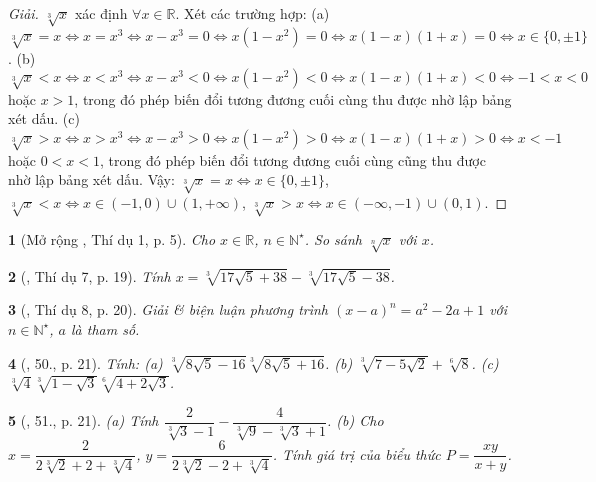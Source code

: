 \documentclass{article}
\newtheorem{baitoan}{}
\begin{document}
\begin{proof}[Giải]
	$\sqrt[3]{x}$ xác định $\forall x\in\mathbb{R}$. Xét các trường hợp: (a) $\sqrt[3]{x} = x\Leftrightarrow x = x^3\Leftrightarrow x - x^3 = 0\Leftrightarrow x(1 - x^2) = 0\Leftrightarrow x(1 - x)(1 + x) = 0\Leftrightarrow x\in\{0,\pm1\}$. (b) $\sqrt[3]{x} < x\Leftrightarrow x < x^3\Leftrightarrow x - x^3 < 0\Leftrightarrow x(1 - x^2) < 0\Leftrightarrow x(1 - x)(1 + x) < 0\Leftrightarrow -1 < x < 0$ hoặc $x > 1$, trong đó phép biến đổi tương đương cuối cùng thu được nhờ lập bảng xét dấu. (c) $\sqrt[3]{x} > x\Leftrightarrow x > x^3\Leftrightarrow x - x^3 > 0\Leftrightarrow x(1 - x^2) > 0\Leftrightarrow x(1 - x)(1 + x) > 0\Leftrightarrow x < -1$ hoặc $0 < x < 1$, trong đó phép biến đổi tương đương cuối cùng cũng thu được nhờ lập bảng xét dấu. Vậy: $\sqrt[3]{x} = x\Leftrightarrow x\in\{0,\pm1\}$, $\sqrt[3]{x} < x\Leftrightarrow x\in(-1,0)\cup(1,+\infty)$, $\sqrt[3]{x} > x\Leftrightarrow x\in(-\infty,-1)\cup(0,1)$.
\end{proof}

\begin{baitoan}[Mở rộng \cite{Tuyen_Toan_9_old}, Thí dụ 1, p. 5]
	Cho $x\in\mathbb{R}$, $n\in\mathbb{N}^\star$. So sánh $\sqrt[n]{x}$ với $x$.
\end{baitoan}

\begin{baitoan}[\cite{Tuyen_Toan_9_old}, Thí dụ 7, p. 19]
	Tính $x = \sqrt[3]{17\sqrt{5} + 38} - \sqrt[3]{17\sqrt{5} - 38}$.
\end{baitoan}

\begin{baitoan}[\cite{Tuyen_Toan_9_old}, Thí dụ 8, p. 20]
	Giải \& biện luận phương trình $(x - a)^n = a^2 - 2a + 1$ với $n\in\mathbb{N}^\star$, $a$ là tham số.
\end{baitoan}

\begin{baitoan}[\cite{Tuyen_Toan_9_old}, 50., p. 21]
	Tính: (a) $\sqrt[3]{8\sqrt{5} - 16}\sqrt[3]{8\sqrt{5} + 16}$. (b) $\sqrt[3]{7 - 5\sqrt{2}} + \sqrt[6]{8}$. (c) $\sqrt[3]{4}\sqrt[3]{1 - \sqrt{3}}\sqrt[6]{4 + 2\sqrt{3}}$.
\end{baitoan}

\begin{baitoan}[\cite{Tuyen_Toan_9_old}, 51., p. 21]
	(a) Tính $\dfrac{2}{\sqrt[3]{3} - 1} - \dfrac{4}{\sqrt[3]{9} - \sqrt[3]{3} + 1}$. (b) Cho $x = \dfrac{2}{2\sqrt[3]{2} + 2 + \sqrt[3]{4}}$, $y = \dfrac{6}{2\sqrt[3]{2} - 2 + \sqrt[3]{4}}$. Tính giá trị của biểu thức $P = \dfrac{xy}{x + y}$.
\end{baitoan}
\end{document}
